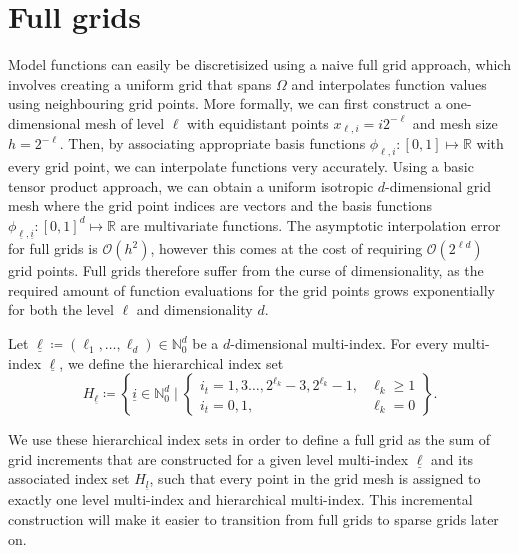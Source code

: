 \documentclass[
  a4paper,  %
  twoside,  %
  bibliography=totoc,
  headsepline,
  cleardoublepage=empty,
  parskip=half,
  draft=false
]{scrbook}
\begin{document}
\section{Full grids}

Model functions can easily be discretisized using a naive full grid approach, which involves creating a uniform grid that spans $\Omega$ and interpolates function values using neighbouring grid points.
More formally, we can first construct a one-dimensional mesh of level $\ell$ with equidistant points $x_{\ell,i}=i2^{-\ell}$ and mesh size $h=2^{-\ell}$.
Then, by associating appropriate basis functions $\phi_{\ell,i} \colon [0,1] \mapsto \mathds{R}$ with every grid point, we can interpolate functions very accurately.
Using a basic tensor product approach, we can obtain a uniform isotropic $d$-dimensional grid mesh where the grid point indices are vectors and the basis functions $\phi_{\underline{\ell},\underline{i}} \colon [0,1]^d \mapsto \mathds{R}$ are multivariate functions.
The asymptotic interpolation error for full grids is $\mathcal{O}(h^2)$, however this comes at the cost of requiring $\mathcal{O}(2^{\ell d})$ grid points.
Full grids therefore suffer from the curse of dimensionality, as the required amount of function evaluations for the grid points grows exponentially for both the level $\ell$ and dimensionality $d$.

\begin{definition}
Let $\underline{\ell} \coloneqq (\ell_1, \dots, \ell_d) \in \mathds{N}_0^d$ be a $d$-dimensional multi-index.
For every multi-index $\underline{\ell}$, we define the hierarchical index set
\begin{equation}
H_{\underline{\ell}} \coloneqq \left\{ \underline{i} \in \mathds{N}^d_0 \mid
\begin{cases}
    i_t=1,3\dots,2^{\ell_k} - 3, 2^{\ell_k} - 1, & \ell_k \geq 1 \\
    i_t=0,1, & \ell_k = 0
\end{cases} \right\}.
\nonumber
\end{equation}
\end{definition}
%
We use these hierarchical index sets in order to define a full grid as the sum of grid increments that are constructed for a given level multi-index $\underline{\ell}$ and its associated index set $H_{\underline{l}}$, such that every point in the grid mesh is assigned to exactly one level multi-index and hierarchical multi-index.
This incremental construction will make it easier to transition from full grids to sparse grids later on.
\end{document}
